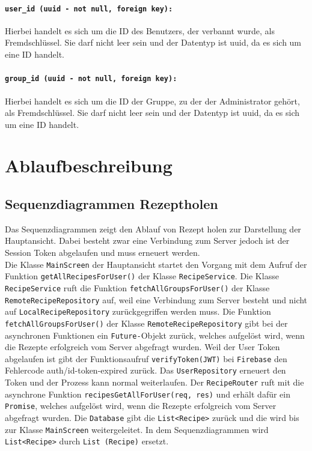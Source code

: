 \documentclass{entwurfsheft}
\begin{document}
\begin{sloppypar}
\paragraph{\texttt{user\_id (uuid - not null, foreign key):}} Hierbei handelt es sich um die ID des Benutzers, der verbannt wurde, als Fremdschlüssel. Sie darf nicht leer sein und der Datentyp ist \Gls{uuid}, da es sich um eine ID handelt.
\paragraph{\texttt{group\_id (uuid - not null, foreign key):}} Hierbei handelt es sich um die ID der Gruppe, zu der der Administrator gehört, als Fremdschlüssel. Sie darf nicht leer sein und der Datentyp ist \Gls{uuid}, da es sich um eine ID handelt.
\newpage

\section{Ablaufbeschreibung}
    \subsection{Sequenzdiagrammen Rezeptholen}
            Das Sequenzdiagrammen zeigt den Ablauf von Rezept holen zur Darstellung der Hauptansicht. Dabei besteht zwar eine Verbindung zum Server jedoch ist der Session Token abgelaufen und muss erneuert werden.\\
            Die Klasse \texttt{MainScreen} der Hauptansicht startet den Vorgang mit dem Aufruf der Funktion \texttt{getAllRecipesForUser()} der Klasse \texttt{RecipeService}. Die Klasse \texttt{RecipeService} ruft die Funktion \texttt{fetchAllGroupsForUser()} der Klasse \texttt{RemoteRecipeRepository} auf, weil eine Verbindung zum Server besteht und nicht auf \texttt{LocalRecipeRepository} zurückgegriffen werden muss. Die Funktion \texttt{fetchAllGroupsForUser()} der Klasse \texttt{RemoteRecipeRepository} gibt bei der asynchronen Funktionen ein \texttt{Future-}Objekt zurück, welches aufgelöst wird, wenn die Rezepte erfolgreich vom Server abgefragt wurden. Weil der User Token abgelaufen ist gibt der Funktionsaufruf \texttt{verifyToken(JWT)} bei \texttt{Firebase} den Fehlercode auth\slash id-token-expired zurück. Das \texttt{UserRepository} erneuert den Token und der Prozess kann normal weiterlaufen. Der \texttt{RecipeRouter} ruft mit die asynchrone Funktion \texttt{recipesGetAllForUser(req, res)} und erhält dafür ein \texttt{Promise}, welches aufgelöst wird, wenn die Rezepte erfolgreich vom Server abgefragt wurden. Die \texttt{Database} gibt die \texttt{List<Recipe>} zurück und die wird bis zur Klasse \texttt{MainScreen} weitergeleitet. In dem Sequenzdiagrammen wird \texttt{List<Recipe>} durch \texttt{List (Recipe)} ersetzt.
        

\end{sloppypar}
\end{document}

